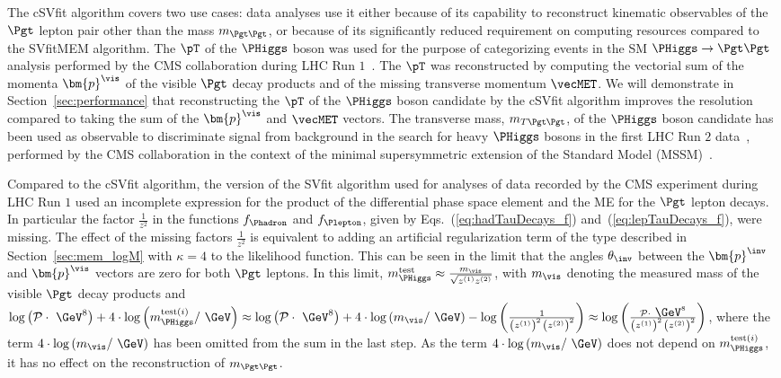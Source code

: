 The cSVfit algorithm covers two use cases:
data analyses use it either because of its capability to reconstruct kinematic observables of the $\Pgt$ lepton pair other than the mass $m_{\Pgt\Pgt}$,
or because of its significantly reduced requirement on computing resources compared to the SVfitMEM algorithm.
The $\pT$ of the $\PHiggs$ boson was used for the purpose of categorizing events in the SM $\PHiggs \to \Pgt\Pgt$ analysis 
performed by the CMS collaboration during LHC Run $1$~\cite{HIG-13-004}.
The $\pT$ was reconstructed by computing the vectorial sum of the momenta $\bm{p}^{\vis}$ of the visible $\Pgt$ decay products and of the missing transverse momentum $\vecMET$.
We will demonstrate in Section~\ref{sec:performance} that reconstructing the $\pT$ of the $\PHiggs$ boson candidate by the cSVfit algorithm
improves the resolution compared to taking the sum of the $\bm{p}^{\vis}$ and $\vecMET$ vectors.
The transverse mass, $m_{T\Pgt\Pgt}$, of the $\PHiggs$ boson candidate has been used as observable to discriminate signal from background
in the search for heavy $\PHiggs$ bosons in the first LHC Run $2$ data~\cite{HIG-16-006}, 
performed by the CMS collaboration in the context of the minimal supersymmetric extension of the Standard Model (MSSM)~\cite{Fayet:1974pd,Fayet:1977yc}.

Compared to the cSVfit algorithm,
the version of the SVfit algorithm used for analyses of data recorded by the CMS experiment during LHC Run $1$
used an incomplete expression for the product of the differential phase space element and the ME for the $\Pgt$ lepton decays.
In particular the factor $\frac{1}{z^{2}}$ in the functions $f_{\Phadron}$ and $f_{\Plepton}$, 
given by Eqs.~(\ref{eq:hadTauDecays_f}) and~(\ref{eq:lepTauDecays_f}), were missing.
The effect of the missing factors $\frac{1}{z^{2}}$ 
is equivalent to adding an artificial regularization term of the type described in Section~\ref{sec:mem_logM} with $\kappa = 4$ to the likelihood function.
This can be seen in the limit that the angles $\theta_{\inv}$ between the $\bm{p}^{\inv}$ and $\bm{p}^{\vis}$ vectors are zero for both $\Pgt$ leptons.
In this limit, $m_{\PHiggs}^{\textrm{test}} \approx \frac{m_{\vis}}{\sqrt{z^{(1)}z^{(2)}}}$,
with $m_{\vis}$ denoting the measured mass of the visible $\Pgt$ decay products
and $\log \left( \mathcal{P} \cdot \mbox{~\GeV}^{8} \right) + 4 \cdot \log \left( m_{\PHiggs}^{\textrm{test}(i)} / \mbox{~\GeV} \right) \approx \log \left( \mathcal{P} \cdot \mbox{~\GeV}^{8} \right) + 4 \cdot \log \left( m_{\vis} / \mbox{~\GeV} \right) - \log \left( \frac{1}{\left( z^{(1)} \right)^{2} \, \left( z^{(2)} \right)^{2}} \right) \approx \log \left( \frac{\mathcal{P} \cdot \mbox{~\GeV}^{8}}{\left( z^{(1)} \right)^{2} \, \left( z^{(2)} \right)^{2}} \right)$,
where the term $4 \cdot \log \left( m_{\vis} / \mbox{~\GeV} \right)$ has been omitted from the sum in the last step.
As the term $4 \cdot \log \left( m_{\vis} / \mbox{~\GeV} \right)$ does not depend on $m_{\PHiggs}^{\textrm{test}(i)}$,
it has no effect on the reconstruction of $m_{\Pgt\Pgt}$.
